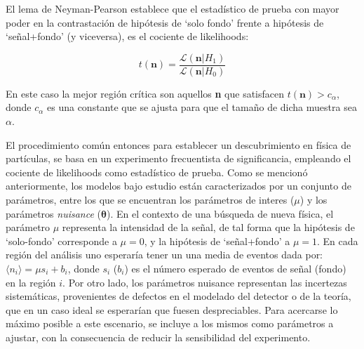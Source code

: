 
El lema de Neyman-Pearson \cite{10.2307/91247} establece que el estadístico de prueba con mayor poder en la contrastación de hipótesis de `solo fondo' frente a hipótesis de `señal+fondo' (y viceversa), es el cociente de likelihoods:


\begin{equation}
	t(\textbf{n}) = \frac{\mathcal{L}(\textbf{n}|H_1)}{\mathcal{L}(\textbf{n}|H_0)}
\end{equation}

En este caso la mejor región crítica son aquellos \textbf{n} que satisfacen $t(\textbf{n})>c_\alpha$, donde $c_\alpha$ es una constante que se ajusta para que el tamaño de dicha muestra sea $\alpha$.

El procedimiento común entonces para establecer un descubrimiento en física de partículas, se basa en un experimento frecuentista de significancia, empleando el cociente de likelihoods como estadístico de prueba. Como se mencionó anteriormente, los modelos bajo estudio están caracterizados por un conjunto de parámetros, entre los que se encuentran los parámetros de interes ($\mu$) y los parámetros \textit{nuisance} ($\bm{\theta}$). 
En el contexto de una búsqueda de nueva física, el parámetro $\mu$ representa la intensidad de la señal, de tal forma que la hipótesis de `solo-fondo' corresponde a $\mu = 0$, y la hipótesis de `señal+fondo' a $\mu = 1$. En cada región del análisis uno esperaría tener un una media de eventos dada por: $\langle n_i \rangle = \mu s_i + b_i$, donde $s_i$ ($b_i$) es el número esperado de eventos de señal (fondo) en la región $i$. Por otro lado, los parámetros nuisance representan las incertezas sistemáticas, provenientes de defectos en el modelado del detector o de la teoría, que en un caso ideal se esperarían que fuesen despreciables. Para acercarse lo máximo posible a este escenario, se incluye a los mismos como parámetros a ajustar, con la consecuencia de reducir la sensibilidad del experimento.

